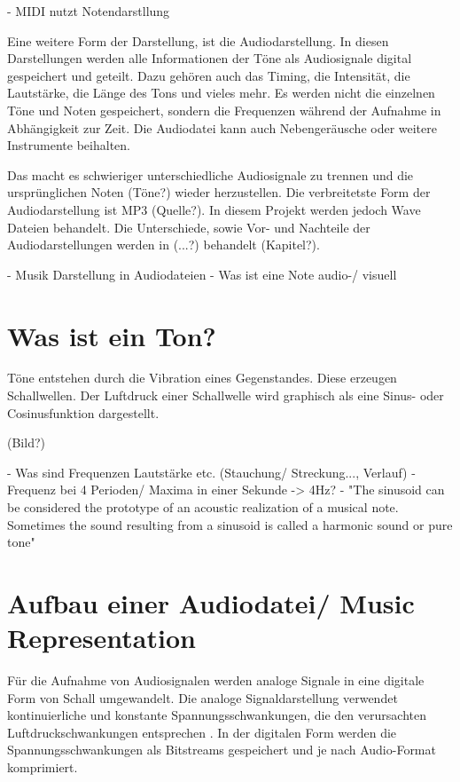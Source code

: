 \par

 - MIDI nutzt Notendarstllung

\par

Eine weitere Form der Darstellung, ist die Audiodarstellung. In diesen Darstellungen werden alle Informationen der Töne als Audiosignale digital gespeichert und geteilt. Dazu gehören auch das Timing, die Intensität, die Lautstärke, die Länge des Tons und vieles mehr. Es werden nicht die einzelnen Töne und Noten gespeichert, sondern die Frequenzen während der Aufnahme in Abhängigkeit zur Zeit. Die Audiodatei kann auch Nebengeräusche oder weitere Instrumente beihalten.

\par

Das macht es schwieriger unterschiedliche Audiosignale zu trennen und die ursprünglichen Noten (Töne?) wieder herzustellen. Die verbreitetste Form der Audiodarstellung ist MP3 (Quelle?). In diesem Projekt werden jedoch Wave Dateien behandelt. Die Unterschiede, sowie Vor- und Nachteile der Audiodarstellungen werden in (...?) behandelt \parencite{fundamentals_of_music_processing} (Kapitel?).

 - Musik Darstellung in Audiodateien
 - Was ist eine Note audio-/ visuell

%
\section{Was ist ein Ton?}
%

Töne entstehen durch die Vibration eines Gegenstandes. Diese erzeugen Schallwellen. Der Luftdruck einer Schallwelle wird graphisch als eine Sinus- oder Cosinusfunktion dargestellt.

%
(Bild?)
%

 - Was sind Frequenzen Lautstärke etc. (Stauchung/ Streckung..., Verlauf)
 - Frequenz bei 4 Perioden/ Maxima in einer Sekunde -> 4Hz?
 - "The sinusoid can be considered the prototype of an acoustic realization of a musical note. Sometimes the sound resulting from a sinusoid is called a harmonic sound
or pure tone"

%
\section{Aufbau einer Audiodatei/ Music Representation}
%

Für die Aufnahme von Audiosignalen werden analoge Signale in eine digitale Form von Schall umgewandelt. Die analoge Signaldarstellung verwendet kontinuierliche und konstante Spannungsschwankungen, die den verursachten Luftdruckschwankungen entsprechen \parencite{digital_representation}. In der digitalen Form werden die Spannungsschwankungen als Bitstreams gespeichert und je nach Audio-Format komprimiert.

